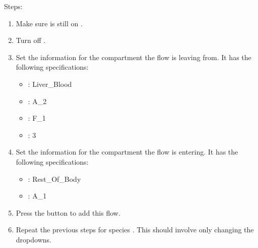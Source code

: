 \documentclass[letterpaper,10pt,english]{sphinxmanual}
\begin{document}
\sphinxAtStartPar
Steps:
\begin{enumerate}
%
\item {} 
\sphinxAtStartPar
Make sure  is still on .

\item {} 
\sphinxAtStartPar
Turn off .

\item {} 
\sphinxAtStartPar
Set the information for the compartment the flow is leaving from. It has the
following specifications:
\begin{itemize}
\item {} 
\sphinxAtStartPar
{}: Liver\_Blood

\item {} 
\sphinxAtStartPar
{}: A\_2

\item {} 
\sphinxAtStartPar
{}: F\_1

\item {} 
\sphinxAtStartPar
{}: 3

\end{itemize}

\item {} 
\sphinxAtStartPar
Set the information for the compartment the flow is entering. It has the
following specifications:
\begin{itemize}
\item {} 
\sphinxAtStartPar
{}: Rest\_Of\_Body

\item {} 
\sphinxAtStartPar
{}: A\_1

\end{itemize}

\item {} 
\sphinxAtStartPar
Press the  button to add this flow.
\begin{quote}

\begin{figure}[htbp]
\centering

\noindent{}
\end{figure}
\end{quote}

\item {} 
\sphinxAtStartPar
Repeat the previous steps for species . This should involve only
changing the  dropdowns.
\begin{quote}

\begin{figure}[htbp]
\centering

\noindent{}
\end{figure}
\end{quote}

\end{enumerate}
\end{document}
